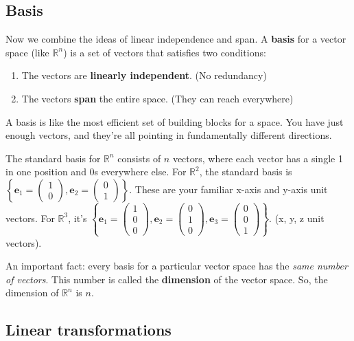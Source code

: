 \documentclass[11pt]{article}
\begin{document}
\subsection{Basis}
Now we combine the ideas of linear independence and span. A \textbf{basis} for a vector space (like $\mathbb{R}^n$) is a set of vectors that satisfies two conditions:
\begin{enumerate}
    \item The vectors are \textbf{linearly independent}. (No redundancy)
    \item The vectors \textbf{span} the entire space. (They can reach everywhere)
\end{enumerate}
A basis is like the most efficient set of building blocks for a space. You have just enough vectors, and they're all pointing in fundamentally different directions.

The standard basis for $\mathbb{R}^n$ consists of $n$ vectors, where each vector has a single 1 in one position and 0s everywhere else.
For $\mathbb{R}^2$, the standard basis is $\left\{ \mathbf{e}_1 = \begin{pmatrix} 1 \\ 0 \end{pmatrix}, \mathbf{e}_2 = \begin{pmatrix} 0 \\ 1 \end{pmatrix} \right\}$. These are your familiar x-axis and y-axis unit vectors.
For $\mathbb{R}^3$, it's $\left\{ \mathbf{e}_1 = \begin{pmatrix} 1 \\ 0 \\ 0 \end{pmatrix}, \mathbf{e}_2 = \begin{pmatrix} 0 \\ 1 \\ 0 \end{pmatrix}, \mathbf{e}_3 = \begin{pmatrix} 0 \\ 0 \\ 1 \end{pmatrix} \right\}$. (x, y, z unit vectors).

An important fact: every basis for a particular vector space has the \textit{same number of vectors}. This number is called the \textbf{dimension} of the vector space. So, the dimension of $\mathbb{R}^n$ is $n$.

\subsection{Linear transformations}
\end{document}

